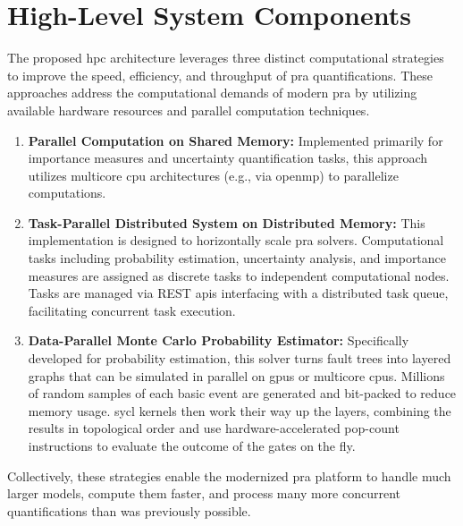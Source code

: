 \section*{High-Level System Components}

The proposed \acrshort{hpc} architecture leverages three distinct computational strategies to improve the speed, efficiency, and throughput of \acrshort{pra} quantifications. These approaches address the computational demands of modern \acrshort{pra} by utilizing available hardware resources and parallel computation techniques.

\begin{enumerate}

    \item \textbf{Parallel Computation on Shared Memory:} Implemented primarily for importance measures and uncertainty quantification tasks, this approach utilizes multicore \acrshort{cpu} architectures (e.g., via \acrshort{openmp}) to parallelize computations.
    
    \item \textbf{Task-Parallel Distributed System on Distributed Memory:} This implementation is designed to horizontally scale \acrshort{pra} solvers. Computational tasks including probability estimation, uncertainty analysis, and importance measures are assigned as discrete tasks to independent computational nodes. Tasks are managed via REST \acrshort{api}s interfacing with a distributed task queue, facilitating concurrent task execution.
    
    \item \textbf{Data-Parallel Monte Carlo Probability Estimator:} Specifically developed for probability estimation, this solver turns fault trees into layered graphs that can be simulated in parallel on \acrshort{gpu}s or multicore \acrshort{cpu}s. Millions of random samples of each basic event are generated and bit-packed to reduce memory usage. \acrshort{sycl} kernels then work their way up the layers, combining the results in topological order and use hardware-accelerated pop-count instructions to evaluate the outcome of the gates on the fly.
\end{enumerate}

Collectively, these strategies enable the modernized \acrshort{pra} platform to handle much larger models, compute them faster, and process many more concurrent quantifications than was previously possible.



